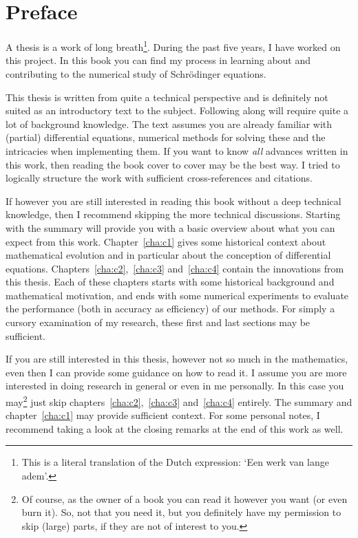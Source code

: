 


\chapter*{Preface}

A thesis is a work of long breath\footnote{This is a literal translation of the Dutch expression: `\foreignlanguage{dutch}{Een werk van lange adem}'.}. During the past five years, I have worked on this project. In this book you can find my process in learning about and contributing to the numerical study of Schrödinger equations.

This thesis is written from quite a technical perspective and is definitely not suited as an introductory text to the subject. Following along will require quite a lot of background knowledge. The text assumes you are already familiar with (partial) differential equations, numerical methods for solving these and the intricacies when implementing them. If you want to know \emph{all} advances written in this work, then reading the book cover to cover may be the best way. I tried to logically structure the work with sufficient cross-references and citations.

If however you are still interested in reading this book without a deep technical knowledge, then I recommend skipping the more technical discussions. Starting with the summary will provide you with a basic overview about what you can expect from this work. Chapter~\ref{cha:c1} gives some historical context about mathematical evolution and in particular about the conception of differential equations. Chapters~\ref{cha:c2},~\ref{cha:c3} and~\ref{cha:c4} contain the innovations from this thesis. Each of these chapters starts with some historical background and mathematical motivation, and ends with some numerical experiments to evaluate the performance (both in accuracy as efficiency) of our methods. For simply a cursory examination of my research, these first and last sections may be sufficient.

If you are still interested in this thesis, however not so much in the mathematics, even then I can provide some guidance on how to read it. I assume you are more interested in doing research in general or even in me personally. In this case you may\footnote{Of course, as the owner of a book you can read it however you want (or even burn it). So, not that you need it, but you definitely have my permission to skip (large) parts, if they are not of interest to you.} just skip chapters~\ref{cha:c2},~\ref{cha:c3} and~\ref{cha:c4} entirely. The summary and chapter~\ref{cha:c1} may provide sufficient context. For some personal notes, I recommend taking a look at the closing remarks at the end of this work as well.

